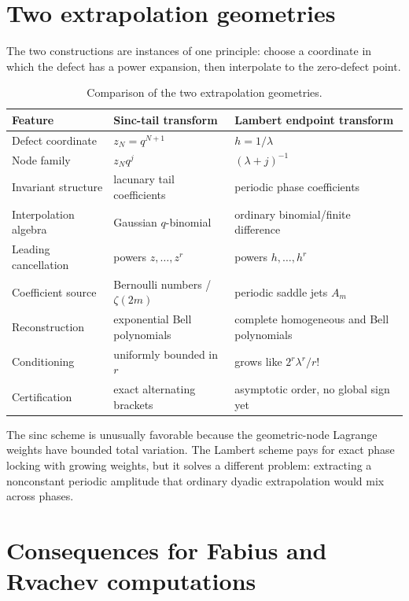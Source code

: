\documentclass[11pt]{article}
\theoremstyle{definition}
\theoremstyle{remark}
\begin{document}
\section{Two extrapolation geometries}
\label{sec:dual-geometries}

The two constructions are instances of one principle: choose a coordinate in which the defect has a power expansion, then interpolate to the zero-defect point.

\begin{table}[htbp]
\centering
\caption{Comparison of the two extrapolation geometries.}
\label{tab:geometries}
\begin{tabularx}{\textwidth}{@{}l X X@{}}
\toprule
Feature & Sinc-tail transform & Lambert endpoint transform \\
\midrule
Defect coordinate & $z_N=q^{N+1}$ & $h=1/\lambda$ \\
Node family & $z_Nq^j$ & $(\lambda+j)^{-1}$ \\
Invariant structure & lacunary tail coefficients & periodic phase coefficients \\
Interpolation algebra & Gaussian $q$-binomial & ordinary binomial/finite difference \\
Leading cancellation & powers $z,\ldots,z^r$ & powers $h,\ldots,h^r$ \\
Coefficient source & Bernoulli numbers / $\zeta(2m)$ & periodic saddle jets $A_m$ \\
Reconstruction & exponential Bell polynomials & complete homogeneous and Bell polynomials \\
Conditioning & uniformly bounded in $r$ & grows like $2^r\lambda^r/r!$ \\
Certification & exact alternating brackets & asymptotic order, no global sign yet \\
\bottomrule
\end{tabularx}
\end{table}

The sinc scheme is unusually favorable because the geometric-node Lagrange weights have bounded total variation. The Lambert scheme pays for exact phase locking with growing weights, but it solves a different problem: extracting a nonconstant periodic amplitude that ordinary dyadic extrapolation would mix across phases.

\section{Consequences for Fabius and Rvachev computations}
\label{sec:consequences}
\end{document}
